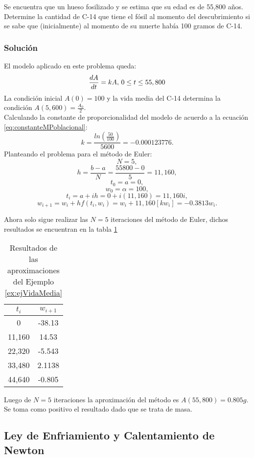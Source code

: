 \begin{exerciseT}{\rm Se encuentra que un hueso fosilizado y se estima que su edad es de 55,800 años. Determine la cantidad de C-14 que 
tiene el fósil al momento del descubrimiento si se sabe que (inicialmente) al momento de su muerte había 100 gramos de C-14.
	
	\subsubsection*{Solución}
	El modelo aplicado en este problema queda:
	$${dA\over dt} = kA, \, 0\leq t\leq 55,800$$
	La condición inicial $A(0)=100$ y la vida media del C-14 determina la condición $A(5,600)=\displaystyle{\frac{A_0}{2}}$.\\
	Calculando la constante de proporcionalidad del modelo de acuerdo a la ecuación \ref{eq:constanteMPoblacional}:	
	$$k=\frac{ln \left(\displaystyle{\frac{50}{100}} \right)}{5600} = -0.000123776.$$
	Planteando el problema para el método de Euler:
	$$N=5,$$
	$$h=\frac{b-a}{N} = \frac{55800-0}{5} = 11,160,$$
	$$t_0 = a = 0,$$
	$$w_0 = \alpha = 100,$$
	$$t_i = a+ih = 0 + i(11,160) = 11,160i,$$
	$$w_{i+1} = w_i + hf(t_i,w_i) = w_i + 11,160[kw_i] = -0.3813w_i.$$
	
	Ahora solo sigue realizar las $N=5$ iteraciones del método de Euler, dichos resultados se encuentran en la tabla \ref{table:resEjVidaMedia}
	
	\begin{table}[H]
    	\centering
      	\begin{tabular}{c|c}
      		\toprule
      		$t_i$ & $w_{i+1}$\\
      		\midrule
			0 		& -38.13\\
			11,160 	& 14.53\\
			22,320 	& -5.543\\
			33,480	& 2.1138\\
			44,640	& -0.805\\
			\bottomrule
      	\end{tabular}
      	\caption{Resultados de las aproximaciones del Ejemplo \ref{ex:ejVidaMedia}}
      	\label{table:resEjVidaMedia}
  	\end{table} 
	
	Luego de $N=5$ iteraciones la aproximación del método es $A(55,800) = 0.805g$. Se toma como positivo el resultado dado que se trata de masa.
	\label{ex:ejVidaMedia}
}\end{exerciseT}

\subsection{Ley de Enfriamiento y Calentamiento de Newton}

